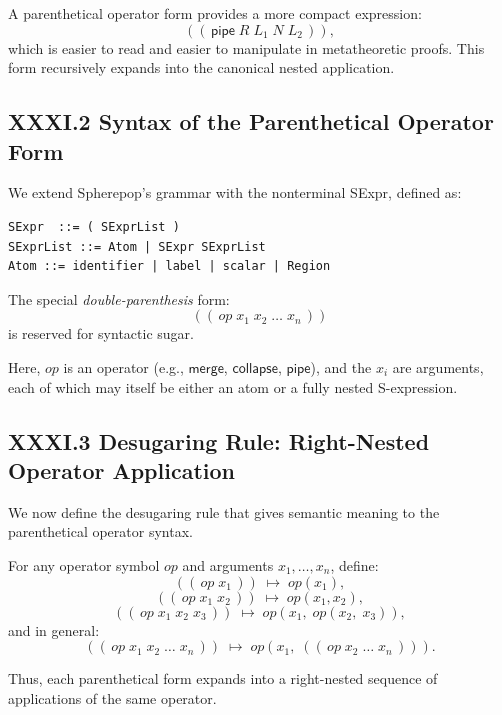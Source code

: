 \documentclass[12pt,letterpaper]{article}
\begin{document}
A parenthetical operator form provides a more compact expression:
\[
((\,\mathsf{pipe}\; R\; L_1\; N\; L_2\,)),
\]
which is easier to read and easier to manipulate in metatheoretic proofs. This form recursively expands into the canonical nested application.

\subsection{XXXI.2 Syntax of the Parenthetical Operator Form}

We extend Spherepop's grammar with the nonterminal \textsf{SExpr}, defined as:

\begin{verbatim}
SExpr  ::= ( SExprList )
SExprList ::= Atom | SExpr SExprList
Atom ::= identifier | label | scalar | Region
\end{verbatim}

The special \emph{double-parenthesis} form:
\[
((\,op\; x_1\; x_2\; \ldots\; x_n\,))
\]
is reserved for syntactic sugar.

Here, $op$ is an operator (e.g., $\mathsf{merge}$, $\mathsf{collapse}$, $\mathsf{pipe}$), and the $x_i$ are arguments, each of which may itself be either an atom or a fully nested S-expression.

\subsection{XXXI.3 Desugaring Rule: Right-Nested Operator Application}

We now define the desugaring rule that gives semantic meaning to the parenthetical operator syntax.

\begin{definition}
For any operator symbol $op$ and arguments $x_1,\ldots,x_n$, define:
\[
((\,op\; x_1\,)) \;\mapsto\; op(x_1),
\]
\[
((\,op\; x_1\; x_2\,)) \;\mapsto\; op(x_1, x_2),
\]
\[
((\,op\; x_1\; x_2\; x_3\,)) \;\mapsto\; op(x_1,\; op(x_2,\; x_3)),
\]
and in general:
\[
((\,op\; x_1\; x_2\; \ldots\; x_n\,)) 
\;\mapsto\;
op(x_1,\; ((\,op\; x_2\; \ldots\; x_n\,))).
\]
\end{definition}

Thus, each parenthetical form expands into a right-nested sequence of applications of the same operator.
\end{document}
